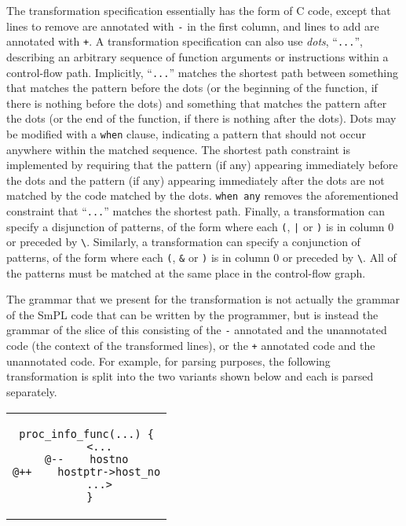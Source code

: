 The transformation specification essentially has the form of C code, except
that lines to remove are annotated with \verb+-+ in the first column, and
lines to add are annotated with \verb-+-.  A transformation specification
can also use {\em dots}, ``\verb-...-'', describing an arbitrary sequence
of function arguments or instructions within a control-flow path.
Implicitly, ``\verb-...-'' matches the shortest path between something that
matches the pattern before the dots (or the beginning of the function, if
there is nothing before the dots) and something that matches the pattern
after the dots (or the end of the function, if there is nothing after the
dots).  Dots may be modified with a {\tt when} clause, indicating a pattern
that should not occur anywhere within the matched sequence.  The shortest
path constraint is implemented by requiring that the pattern (if any)
appearing immediately before the dots and the pattern (if any) appearing
immediately after the dots are not matched by the code matched by the dots.
{\tt when any}
removes the aforementioned constraint that ``\verb-...-'' matches the
shortest path.  Finally, a transformation can specify a disjunction of
patterns, of the form  where each \texttt{(}, \texttt{|} or \texttt{)} is
in column 0 or preceded by \texttt{\textbackslash}.
Similarly, a transformation can specify a conjunction of
patterns, of the form  where each \texttt{(}, \texttt{\&} or \texttt{)} is
in column 0 or preceded by \texttt{\textbackslash}.  All of the patterns
must be matched at the same place in the control-flow graph.

The grammar that we present for the transformation is not actually the
grammar of the SmPL code that can be written by the programmer, but is
instead the grammar of the slice of this consisting of the {\tt -}
annotated and the unannotated code (the context of the transformed lines),
or the {\tt +} annotated code and the unannotated code.  For example, for
parsing purposes, the following transformation
is split into the two variants shown below and each is parsed
separately.

\begin{center}
\begin{tabular}{c}
\begin{lstlisting}[language=Cocci]
  proc_info_func(...) {
    <...
@--    hostno
@++    hostptr->host_no
    ...>
 }
\end{lstlisting}\\
\end{tabular}
\end{center}

